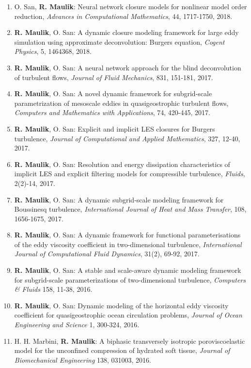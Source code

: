 \documentclass[letterpaper]{article}
\begin{document}
\begin{enumerate}
\item O. San, \textbf{R. Maulik}: Neural network closure models for nonlinear model order reduction, {\it Advances in Computational Mathematics}, 44, 1717-1750, 2018. 

\item \textbf{R. Maulik}, O. San: A dynamic closure modeling framework for large eddy simulation using approximate deconvolution: Burgers equation, {\it Cogent Physics}, 5, 1464368, 2018. 

\item \textbf{R. Maulik}, O. San: A neural network approach for the blind deconvolution of turbulent flows, {\it Journal of Fluid Mechanics}, 831, 151-181, 2017. 

\item \textbf{R. Maulik}, O. San: A novel dynamic framework for subgrid-scale parametrization of mesoscale eddies in quasigeostrophic turbulent flows, {\it Computers and Mathematics with Applications}, 74, 420-445, 2017. 

\item \textbf{R. Maulik}, O. San: Explicit and implicit LES closures for Burgers turbulence, {\it Journal of Computational and Applied Mathematics}, 327, 12-40, 2017. 

\item \textbf{R. Maulik}, O. San: Resolution and energy dissipation characteristics of implicit LES and explicit filtering models for compressible turbulence, {\it Fluids}, 2(2)-14, 2017. 

\item \textbf{R. Maulik}, O. San: A dynamic subgrid-scale modeling framework for Boussinesq turbulence, {\it International Journal of Heat and Mass Transfer}, 108, 1656-1675, 2017. 

\item \textbf{R. Maulik}, O. San: A dynamic framework for functional parameterisations of the eddy viscosity coefficient in two-dimensional turbulence, {\it International Journal of Computational Fluid Dynamics}, 31(2), 69-92, 2017. 

\item \textbf{R. Maulik}, O. San: A stable and scale-aware dynamic modeling framework for subgrid-scale parameterizations of two-dimensional turbulence, {\it Computers \& Fluids} 158, 11-38, 2016. 

\item \textbf{R. Maulik}, O. San: Dynamic modeling of the horizontal eddy viscosity coefficient for quasigeostrophic ocean circulation problems, {\it Journal of Ocean Engineering and Science} 1, 300-324, 2016.

\item H. H. Marbini, \textbf{R. Maulik}: A biphasic transversely isotropic poroviscoelastic model for the unconfined compression of hydrated soft tissue, {\it Journal of Biomechanical Engineering} 138, 031003, 2016.

\end{enumerate}
\end{document}
